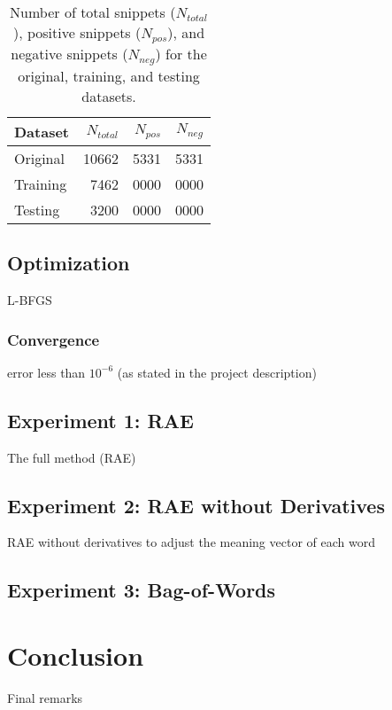 \documentclass{article}
\newcommand{\ra}[1]{\renewcommand{\arraystretch}{#1}}
\begin{document}
\begin{table}[t]
    \centering

    \caption{Number of total snippets ($N_{total}$), positive snippets ($N_{pos}$), and negative snippets ($N_{neg}$) for the original, training, and testing datasets.} 
    \label{tab:datasets}

    \ra{1.2}
    \begin{tabular}{@{} l r r r  @{}}
        \\
        \toprule
        \bf{Dataset} & $N_{total}$ & $N_{pos}$ & $N_{neg}$ \\
        \midrule
        Original & 10662 & 5331 & 5331 \\
        Training &  7462 & 0000 & 0000 \\
        Testing  &  3200 & 0000 & 0000 \\
        \bottomrule
    \end{tabular}
\end{table}


%
%
\subsection{Optimization}
L-BFGS

\subsubsection{Convergence}
error less than $10^{-6}$ (as stated in the project description)


%
%
\subsection{Experiment 1: RAE}
The full method (RAE)


%
%
\subsection{Experiment 2: RAE without Derivatives}
RAE without derivatives to adjust the meaning vector of each word


%
%
\subsection{Experiment 3: Bag-of-Words}



\section{Conclusion}
Final remarks




\small{


}
\end{document}
